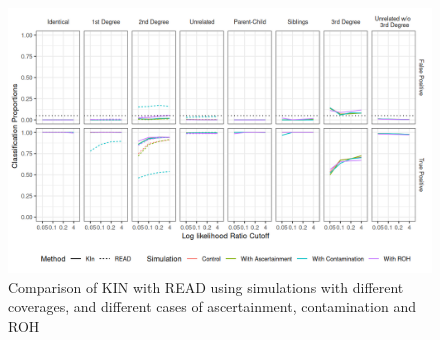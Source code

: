 \documentclass[12pt, letterpaper]{article}
\begin{document}
\begin{figure}[h!]
    \includegraphics[width=16cm]{plots/plotimg/comparison_plot.png}
    \centering
    \caption{Comparison of KIN with READ using simulations with different coverages, and different cases of ascertainment, contamination and ROH}
    \label{fig4:Comparison_READ_KIN}
\end{figure}
\end{document}

